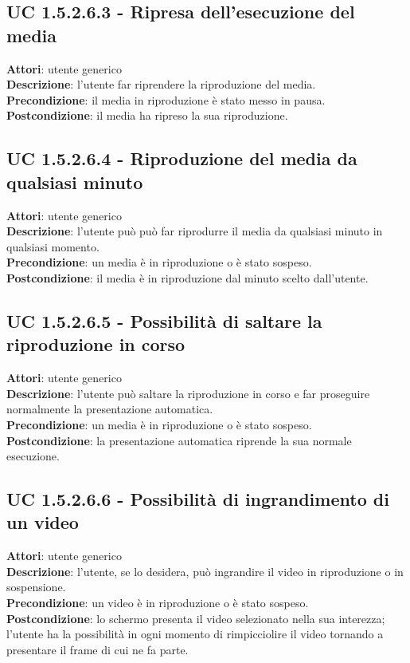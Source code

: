 	\subsection{UC 1.5.2.6.3 - Ripresa dell'esecuzione del media}{
		\label{uc1.5.2.6.3}
		\textbf{Attori}: utente generico \\
		\textbf{Descrizione}: l'utente far riprendere la riproduzione del media. \\
		\textbf{Precondizione}: il media in riproduzione è stato messo in pausa.	\\
		\textbf{Postcondizione}: il media ha ripreso la sua riproduzione.	\\
	}
	\subsection{UC 1.5.2.6.4 - Riproduzione del media da qualsiasi minuto}{
		\label{uc1.5.2.6.4}
		\textbf{Attori}: utente generico \\
		\textbf{Descrizione}: l'utente può può far riprodurre il media da qualsiasi minuto in qualsiasi momento. \\
		\textbf{Precondizione}: un media è in riproduzione o è stato sospeso.	\\
		\textbf{Postcondizione}: il media è in riproduzione dal minuto scelto dall'utente.	\\
	}
	\subsection{UC 1.5.2.6.5 - Possibilità di saltare la riproduzione in corso}{
		\label{uc1.5.2.6.5}
		\textbf{Attori}: utente generico \\
		\textbf{Descrizione}: l'utente può saltare la riproduzione in corso e far proseguire normalmente la presentazione automatica. \\
		\textbf{Precondizione}: un media è in riproduzione o è stato sospeso.	\\
		\textbf{Postcondizione}: la presentazione automatica riprende la sua normale esecuzione.	\\
	}
	\subsection{UC 1.5.2.6.6 - Possibilità di ingrandimento di un video}{
		\label{uc1.5.2.6.6}
		\textbf{Attori}: utente generico \\
		\textbf{Descrizione}: l'utente, se lo desidera, può ingrandire il video in riproduzione o in sospensione. \\
		\textbf{Precondizione}: un video è in riproduzione o è stato sospeso.	\\
		\textbf{Postcondizione}: lo schermo presenta il video selezionato nella sua interezza; l'utente ha la possibilità in ogni momento di rimpicciolire il video tornando a presentare il frame di cui ne fa parte.	\\
	}
